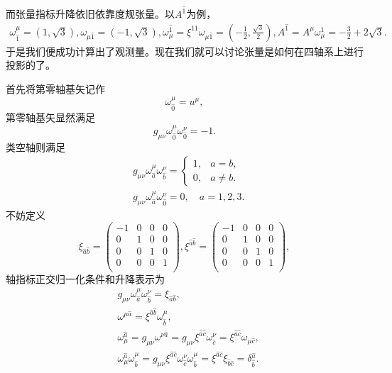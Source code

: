 \documentclass[11pt, a4paper, oneside, onecolumn]{ctexart}
\numberwithin{equation}{subsection}
\begin{document}
而张量指标升降依旧依靠度规张量。以$A^{\hat{1}}$为例，
\begin{align}
\omega^{\mu}_{\hat{1}}=\left(1,\sqrt{3}\right),\omega_{\mu\hat{1}}=\left(-1,\sqrt{3}\right),\omega^{\hat{1}}_{\mu}=\xi^{11}\omega_{\mu\hat{1}}=\left(-\frac{1}{2},\frac{\sqrt{3}}{2}\right),A^{\hat{1}}=A^{\mu}\omega_{\mu}^{\hat{1}}=-\frac{3}{2}+2\sqrt{3}.
\end{align}
于是我们便成功计算出了观测量。现在我们就可以讨论张量是如何在四轴系上进行投影的了。

首先将第零轴基矢记作
\begin{equation}
\omega^{\mu}_{\hat{0}}=u^{\mu},
\end{equation}
第零轴基矢显然满足
\begin{equation}
g_{\mu\nu}\omega^{\mu}_{\hat{0}}\omega^{\nu}_{\hat{0}}=-1.
\end{equation}
类空轴则满足
\begin{align}
&g_{\mu\nu}\omega^{\mu}_{\hat{a}}\omega^{\nu}_{\hat{b}}=
\begin{cases}
1,&a=b,\\
0,&a\ne b.
\end{cases}\\
&g_{\mu\nu}\omega^{\mu}_{\hat{a}}\omega^{\nu}_{\hat{0}}=0,\quad a=1,2,3.
\end{align}
不妨定义
\begin{equation}
\xi_{\hat{a}\hat{b}}=\begin{pmatrix}
-1 & 0 & 0 & 0\\
0 & 1 & 0 & 0\\
0 & 0 & 1 & 0\\
0 & 0 & 0 & 1\\
\end{pmatrix},\xi^{\hat{a}\hat{b}}=\begin{pmatrix}
-1 & 0 & 0 & 0\\
0 & 1 & 0 & 0\\
0 & 0 & 1 & 0\\
0 & 0 & 0 & 1\\
\end{pmatrix},
\end{equation}
轴指标正交归一化条件和升降表示为
\begin{align}
&g_{\mu\nu}\omega^{\mu}_{\hat{a}}\omega^{\nu}_{\hat{b}}=\xi_{\hat{a}\hat{b}},\\
&\omega^{\mu\hat{a}}=\xi^{\hat{a}\hat{b}}\omega^{\mu}_{\hat{b}},\\
&\omega_{\mu}^{\hat{a}}=g_{\mu\nu}\omega^{\nu\hat{a}}=g_{\mu\nu}\xi^{\hat{a}\hat{c}}\omega^{\nu}_{\hat{c}}=\xi^{\hat{a}\hat{c}}\omega_{\mu\hat{c}},\\
&\omega^{\hat{a}}_{\mu}\omega^{\mu}_{\hat{b}}=g_{\mu\nu}\xi^{\hat{a}\hat{c}}\omega^{\nu}_{\hat{c}}\omega^{\mu}_{\hat{b}}=\xi^{\hat{a}\hat{c}}\xi_{\hat{b}\hat{c}}=\delta{}^{\hat{a}}_{\hat{b}}.
\end{align}
\end{document}
